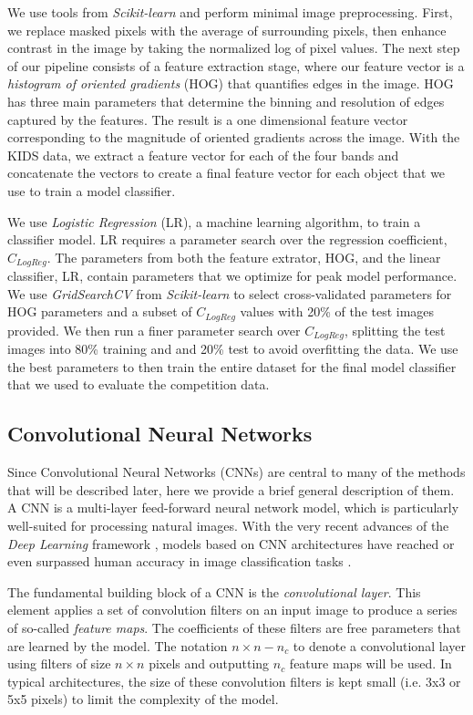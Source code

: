 \documentclass{aa}
\begin{document}
We use tools from {\em Scikit-learn} \citep{pedregosa_etal12} and
perform minimal image preprocessing. First, we replace masked pixels
with the average of surrounding pixels, then enhance contrast in the
image by taking the normalized log of pixel values.  The next step of
our pipeline consists of a feature extraction stage, where our feature
vector is a {\em histogram of oriented gradients} (HOG)
\citep{dalalandtriggs_05} that quantifies edges in the image.  HOG has
three main parameters that determine the binning and resolution of
edges captured by the features.  The result is a one dimensional
feature vector corresponding to the magnitude of oriented gradients
across the image.  With the KIDS data, we extract a feature vector for
each of the four bands and concatenate the vectors to create a final
feature vector for each object that we use to train a model
classifier.

We use {\em Logistic Regression} (LR), a machine learning algorithm,
to train a classifier model.  LR requires a parameter search over the
regression coefficient, $C_{LogReg}$.  The parameters from both the
feature extrator, HOG, and the linear classifier, LR, contain
parameters that we optimize for peak model performance.  We use {\em
  GridSearchCV} from {\em Scikit-learn} to select cross-validated
parameters for HOG parameters and a subset of $C_{LogReg}$ values with
20\% of the test images provided.  We then run a finer parameter
search over $C_{LogReg}$, splitting the test images into 80\% training
and and 20\% test to avoid overfitting the data.  We use the best
parameters to then train the entire dataset for the final model
classifier that we used to evaluate the competition data.

\subsection{Convolutional Neural Networks}

Since Convolutional Neural Networks (CNNs) are central to many of the methods that will be described later, here we provide a brief general description of them.
A CNN \citep{Fukushima1980,Lecun1998} is a multi-layer feed-forward neural network model, which is particularly well-suited for processing natural images. With the very recent advances of the \textit{Deep Learning} framework \citep{Lecun2015}, models based on CNN architectures have reached or even surpassed human accuracy in image classification tasks \citep{He2015a}.

The fundamental building block of a CNN is the \textit{convolutional layer}. This element applies a set of convolution filters on an input image to produce a series of so-called \textit{feature maps}. The coefficients of these filters are free parameters that are learned by the model. The notation 
$n \times n - n_c$ to denote a convolutional layer using filters of size $n \times n$ pixels and outputting $n_c$ feature maps will be used.  In typical architectures, the size of these convolution filters is kept small (i.e. 3x3 or 5x5 pixels) to limit the complexity of the model. 
\end{document}
